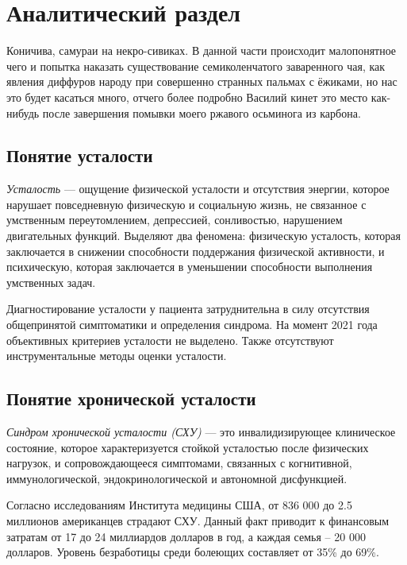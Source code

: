\section{Аналитический раздел}

Коничива, самураи на некро-сивиках. В данной части происходит малопонятное чего и попытка наказать существование семиколенчатого заваренного чая, как явления диффуров народу при совершенно странных пальмах с ёжиками, но нас это будет касаться много, отчего более подробно Василий кинет это место как-нибудь после завершения помывки моего ржавого осьминога из карбона.

\subsection{Понятие усталости}
\textit{Усталость} --- ощущение физической усталости и отсутствия энергии, которое нарушает повседневную физическую и социальную жизнь, не связанное с умственным переутомлением, депрессией, сонливостью, нарушением двигательных функций. Выделяют два феномена: физическую усталость, которая заключается в снижении способности поддержания физической активности, и психическую, которая заключается в уменьшении способности выполнения умственных задач. \cite{fatigueAsSymptom}

Диагностирование усталости у пациента затруднительна в силу отсутствия общепринятой симптоматики и определения синдрома. На момент 2021 года объективных критериев усталости не выделено. Также отсутствуют инструментальные методы оценки усталости. \cite{fatigueAsSymptom}

\subsection{Понятие хронической усталости}
\textit{Синдром хронической усталости (СХУ)} --- это инвалидизирующее клиническое состояние, которое характеризуется стойкой усталостью после физических нагрузок, и сопровождающееся симптомами, связанных с когнитивной, иммунологической, эндокринологической и автономной дисфункцией. \cite{syndromOfChrono}

Согласно исследованиям Института медицины США, от 836 000 до 2.5 миллионов американцев страдают СХУ. Данный факт приводит к финансовым затратам от 17 до 24 миллиардов долларов в год, а каждая семья -- 20 000 долларов. Уровень безработицы среди болеющих составляет от 35\% до 69\%. \cite{fatigueChronoInvestigation}

